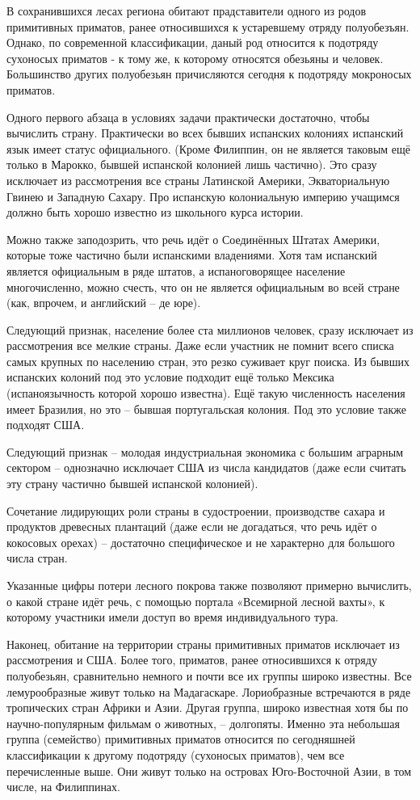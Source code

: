 В сохранившихся лесах региона обитают прадставители одного из родов примитивных приматов, ранее относившихся к устаревшему отряду полуобезъян. Однако, по современной классификации, даный род относится к подотряду сухоносых приматов - к тому же, к которому относятся обезьяны и человек. Большинство других полуобезьян причисляются сегодня к подотряду мокроносых приматов.

\explanationSection

Одного первого абзаца в условиях задачи практически достаточно, чтобы вычислить страну. Практически во всех бывших испанских колониях испанский язык имеет статус официального. (Кроме Филиппин, он не является таковым ещё только в Марокко, бывшей испанской колонией лишь частично). Это сразу исключает из рассмотрения все страны Латинской Америки, Экваториальную Гвинею и Западную Сахару. Про испанскую колониальную империю учащимся должно быть хорошо известно из школьного курса истории.

Можно также заподозрить, что речь идёт о Соединённых Штатах Америки, которые тоже частично были испанскими владениями. Хотя там испанский является официальным в ряде штатов, а испаноговорящее население многочисленно, можно счесть, что он не является официальным во всей стране (как, впрочем, и английский – де юре).

Следующий признак, население более ста миллионов человек, сразу исключает из рассмотрения все мелкие страны. Даже если участник не помнит всего списка самых крупных по населению стран, это резко суживает круг поиска. Из бывших испанских колоний под это условие подходит ещё только Мексика (испаноязычность которой хорошо известна). Ещё такую численность населения имеет Бразилия, но это – бывшая португальская колония. Под это условие также подходят США.

Следующий признак – молодая индустриальная экономика с большим аграрным сектором – однозначно исключает США из числа кандидатов (даже если считать эту страну частично бывшей испанской колонией).

Сочетание лидирующих роли страны в судостроении, производстве сахара и продуктов древесных плантаций (даже если не догадаться, что речь идёт о кокосовых орехах) – достаточно специфическое и не характерно для большого числа стран.

Указанные цифры потери лесного покрова также позволяют примерно вычислить, о какой стране идёт речь, с помощью портала «Всемирной лесной вахты», к которому участники имели доступ во время индивидуального тура.

Наконец, обитание на территории страны примитивных приматов исключает из рассмотрения и США. Более того, приматов, ранее относившихся к отряду полуобезьян, сравнительно немного и почти все их группы широко известны. Все лемурообразные живут только на Мадагаскаре. Лориобразные встречаются в ряде тропических стран Африки и Азии. Другая группа, широко известная хотя бы по научно-популярным фильмам о животных, – долгопяты. Именно эта небольшая группа (семейство) примитивных приматов относится по сегодняшней классификации к другому подотряду (сухоносых приматов), чем все перечисленные выше. Они живут только на островах Юго-Восточной Азии, в том числе, на Филиппинах.

